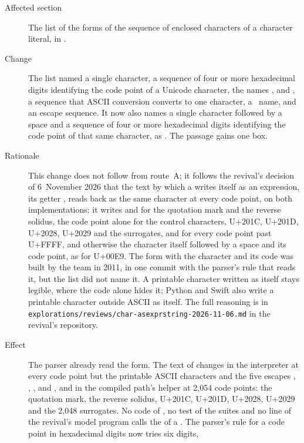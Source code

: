 \begin{description}
\item[Affected section] The list of the forms of the sequence of enclosed
characters of a character literal, in .
\item[Change] The list named a single character, a sequence of four or more
hexadecimal digits identifying the code point of a Unicode character, the
names ,  and , a sequence that ASCII
conversion converts to one character, a \unicode\ name, and an escape sequence.
It now also names a single character followed by a space and a sequence of four
or more hexadecimal digits identifying the code point of that same character,
as .
The passage gains one box.
\item[Rationale] This change does not follow from route~A; it follows the
revival's decision of 6~November 2026 that the text by which a 
writes itself as an expression, its getter , reads back as
the same character at every code point, on both implementations: it writes
 and  for the quotation mark
and the reverse solidus, the code point alone for the control characters,
U+201C, U+201D, U+2028, U+2029 and the surrogates, and for every code point
past U+FFFF, and otherwise the character itself followed by a space and its code
point, as  for U+00E9.
The form with the character and its code was built by the team in 2011, in one
commit with the parser's rule that reads it, but the list did not name it.
A printable character written as itself stays legible, where the code alone
hides it; Python and Swift also write a printable character outside ASCII as
itself.
The full reasoning is in
\nolinkurl{explorations/reviews/char-asexprstring-2026-11-06.md} in the
revival's repository.
\item[Effect] The parser already read the form.
The text of  changes in the interpreter at every code point
but the printable ASCII characters and the five escapes ,
, ,  and
, and in the compiled path's helper at 2,054 code points: the
quotation mark, the reverse solidus, U+201C, U+201D, U+2028, U+2029 and the
2,048 surrogates.
No code of \library, no test of the suites and no line of the revival's model
program calls the  of a .
The parser's rule for a code point in hexadecimal digits now tries six digits,

\end{description}
